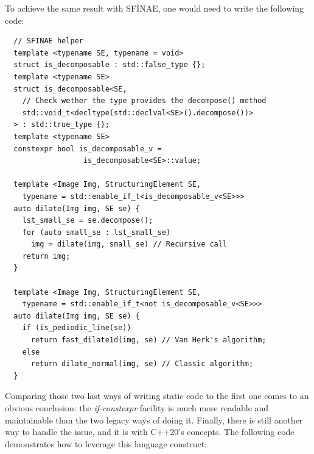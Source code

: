 To achieve the same result with SFINAE, one would need to write the following code:

\begin{verbatim}
  // SFINAE helper
  template <typename SE, typename = void>
  struct is_decomposable : std::false_type {};
  template <typename SE>
  struct is_decomposable<SE,
    // Check wether the type provides the decompose() method
    std::void_t<decltype(std::declval<SE>().decompose())>
  > : std::true_type {};
  template <typename SE>
  constexpr bool is_decomposable_v =
                  is_decomposable<SE>::value;

  template <Image Img, StructuringElement SE,
    typename = std::enable_if_t<is_decomposable_v<SE>>>
  auto dilate(Img img, SE se) {
    lst_small_se = se.decompose();
    for (auto small_se : lst_small_se)
      img = dilate(img, small_se) // Recursive call
    return img;
  }

  template <Image Img, StructuringElement SE,
    typename = std::enable_if_t<not is_decomposable_v<SE>>>
  auto dilate(Img img, SE se) {
    if (is_pediodic_line(se))
      return fast_dilate1d(img, se) // Van Herk's algorithm;
    else
      return dilate_normal(img, se) // Classic algorithm;
  }
\end{verbatim}

Comparing those two last ways of writing static code to the first one comes to an obvious conclusion: the
\emph{if-constexpr} facility is much more readable and maintainable than the two legacy ways of doing it. Finally, there
is still another way to handle the issue, and it is with C++20's concepts. The following code demonstrates how to
leverage this language construct:

